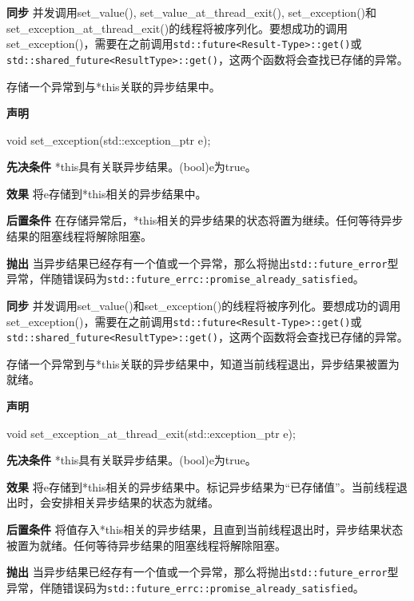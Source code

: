 \textbf{同步}
并发调用set\_value(), set\_value\_at\_thread\_exit(), set\_exception()和set\_exception\_at\_thread\_exit()的线程将被序列化。要想成功的调用set\_exception()，需要在之前调用\texttt{std::future<Result-Type>::get()}或\texttt{std::shared\_future<ResultType>::get()}，这两个函数将会查找已存储的异常。


存储一个异常到与*this关联的异步结果中。

\textbf{声明}

\begin{cpp}
void set_exception(std::exception_ptr e);
\end{cpp}

\textbf{先决条件}
*this具有关联异步结果。(bool)e为true。

\textbf{效果}
将e存储到*this相关的异步结果中。

\textbf{后置条件}
在存储异常后，*this相关的异步结果的状态将置为继续。任何等待异步结果的阻塞线程将解除阻塞。

\textbf{抛出}
当异步结果已经存有一个值或一个异常，那么将抛出\texttt{std::future\_error}型异常，伴随错误码为\texttt{std::future\_errc::promise\_already\_satisfied}。

\textbf{同步}
并发调用set\_value()和set\_exception()的线程将被序列化。要想成功的调用set\_exception()，需要在之前调用\texttt{std::future<Result-Type>::get()}或\texttt{std::shared\_future<ResultType>::get()}，这两个函数将会查找已存储的异常。


存储一个异常到与*this关联的异步结果中，知道当前线程退出，异步结果被置为就绪。

\textbf{声明}

\begin{cpp}
void set_exception_at_thread_exit(std::exception_ptr e);
\end{cpp}

\textbf{先决条件}
*this具有关联异步结果。(bool)e为true。

\textbf{效果}
将e存储到*this相关的异步结果中。标记异步结果为“已存储值”。当前线程退出时，会安排相关异步结果的状态为就绪。

\textbf{后置条件}
将值存入*this相关的异步结果，且直到当前线程退出时，异步结果状态被置为就绪。任何等待异步结果的阻塞线程将解除阻塞。

\textbf{抛出}
当异步结果已经存有一个值或一个异常，那么将抛出\texttt{std::future\_error}型异常，伴随错误码为\texttt{std::future\_errc::promise\_already\_satisfied}。


